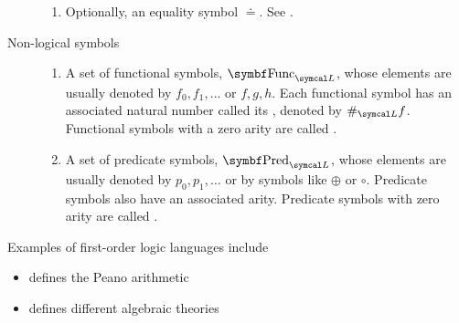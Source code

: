 \begin{definition}
\begin{description}
\begin{enumerate}
      \item Optionally, an equality symbol \( \doteq \). See .
    \end{enumerate}

    \item[Non-logical symbols]
    \mbox{}
    \begin{enumerate}
      \item A set of functional symbols, \( \Cat{Func}_{\Cal{L}} \), whose elements are usually denoted by \( f_0, f_1, \ldots \) or \( f, g, h \). Each functional symbol has an associated natural number called its , denoted by \( \#_{\Cal{L}} f \). Functional symbols with a zero arity are called .

      \item A set of predicate symbols, \( \Cat{Pred}_{\Cal{L}} \), whose elements are usually denoted by \( p_0, p_1, \ldots \) or by symbols like \( \oplus \) or \( \circ \). Predicate symbols also have an associated arity. Predicate symbols with zero arity are called .
    \end{enumerate}
  \end{description}
\end{definition}

\begin{example}\label{ex:first_order_languages}
  Examples of first-order logic languages include
  \begin{itemize}
    \item {} defines the Peano arithmetic
    \item {} defines different algebraic theories
  \end{itemize}
\end{example}

